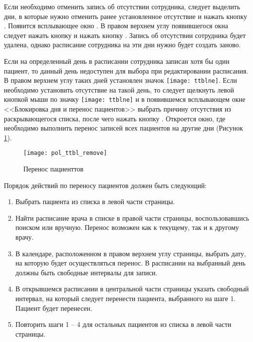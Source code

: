 {Если необходимо отменить запись об отсутствии сотрудника, следует выделить дни, в которые нужно отменить ранее установленное отсутствие и нажать кнопку . Появится всплывающее окно . В правом верхнем углу появившегося окна следует нажать кнопку  и нажать кнопку . Запись об отсутствии сотрудника будет удалена, однако расписание сотрудника на эти дни нужно будет создать заново.

Если на определенный день в расписании сотрудника записан хотя бы один пациент, то данный день недоступен для выбора при редактировании расписания. В правом верхнем углу таких дней установлен значок \texttt{[image: ttblne]}. Если необходимо установить отсутствие на такой день, то следует щелкнуть левой кнопкой мыши по значку \texttt{[image: ttblne]} и в появившемся всплывающем окне <<Блокировка дня и перенос пациентов>> выбрать причину отсутствия из раскрывающегося списка, после чего нажать кнопку . Откроется окно, где необходимо выполнить перенос записей всех пациентов на другие дни (Рисунок \ref{img_pol_ttbl_remove}). 

\begin{figure}[ht]\centering
 \texttt{[image: pol\_ttbl\_remove]}
 \caption{Перенос пациенттов}
 \label{img_pol_ttbl_remove}
\end{figure}

Порядок действий по переносу пациентов должен быть следующий: 

\begin{enumerate}
 \item Выбрать пациента из списка в левой части страницы.
 \item Найти расписание врача в списке в правой части страницы, воспользовавшись поиском или вручную. Перенос возможен как к текущему, так и к другому врачу.
 \item В календаре, расположенном в правом верхнем углу страницы, выбрать дату, на которую будет осуществляться перенос. В расписании на выбранный день должны быть свободные интервалы для записи.
 \item В открывшемся расписании в центральной части страницы указать свободный интервал, на который следует перенести пациента, выбранного на шаге 1. Пациент будет перенесен.
 \item Повторить шаги 1 -- 4 для остальных пациентов из списка в левой части страницы.
\end{enumerate}

}{}

